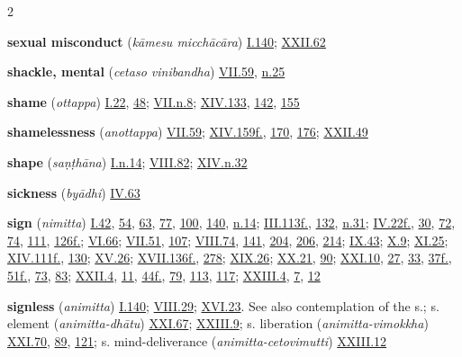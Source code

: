 \begin{multicols}{2}
\begin{vismHanging}
\par\textbf{sexual misconduct} (\emph{kāmesu micchācāra}) \hyperlink{I.140}{I.140}{}; \hyperlink{XXII.62}{XXII.62}{}
\par\textbf{shackle, mental} (\emph{cetaso vinibandha}) \hyperlink{VII.59}{VII.59}{}, \hyperlink{VII.n25}{n.25}{}
\par\textbf{shame} (\emph{ottappa}) \hyperlink{I.22}{I.22}{}, \hyperlink{I.48}{48}{}; \hyperlink{VII.n8}{VII.n.8}{}; \hyperlink{XIV.133}{XIV.133}{}, \hyperlink{XIV.142}{142}{}, \hyperlink{XIV.155}{155}{}
\par\textbf{shamelessness} (\emph{anottappa}) \hyperlink{VII.59}{VII.59}{}; \hyperlink{XIV.159}{XIV.159f.}{}, \hyperlink{XIV.170}{170}{}, \hyperlink{XIV.176}{176}{}; \hyperlink{XXII.49}{XXII.49}{}
\par\textbf{shape} (\emph{saṇṭhāna}) \hyperlink{I.n14}{I.n.14}{}; \hyperlink{VIII.82}{VIII.82}{}; \hyperlink{XIV.n32}{XIV.n.32}{}
\par\textbf{sickness} (\emph{byādhi}) \hyperlink{IV.63}{IV.63}{}
\par\textbf{sign} (\emph{nimitta}) \hyperlink{I.42}{I.42}{}, \hyperlink{I.54}{54}{}, \hyperlink{I.63}{63}{}, \hyperlink{I.77}{77}{}, \hyperlink{I.100}{100}{}, \hyperlink{I.140}{140}{}, \hyperlink{I.n14}{n.14}{}; \hyperlink{III.113}{III.113f.}{}, \hyperlink{III.132}{132}{}, \hyperlink{III.n31}{n.31}{}; \hyperlink{IV.22}{IV.22f.}{}, \hyperlink{IV.30}{30}{}, \hyperlink{IV.72}{72}{}, \hyperlink{IV.74}{74}{}, \hyperlink{IV.111}{111}{}, \hyperlink{IV.126}{126f.}{}; \hyperlink{VI.66}{VI.66}{}; \hyperlink{VII.51}{VII.51}{}, \hyperlink{VII.107}{107}{}; \hyperlink{VIII.74}{VIII.74}{}, \hyperlink{VIII.141}{141}{}, \hyperlink{VIII.204}{204}{}, \hyperlink{VIII.206}{206}{}, \hyperlink{VIII.214}{214}{}; \hyperlink{IX.43}{IX.43}{}; \hyperlink{X.9}{X.9}{}; \hyperlink{XI.25}{XI.25}{}; \hyperlink{XIV.111}{XIV.111f.}{}, \hyperlink{XIV.130}{130}{}; \hyperlink{XV.26}{XV.26}{}; \hyperlink{XVII.136}{XVII.136f.}{}, \hyperlink{XVII.278}{278}{}; \hyperlink{XIX.26}{XIX.26}{}; \hyperlink{XX.21}{XX.21}{}, \hyperlink{XX.90}{90}{}; \hyperlink{XXI.10}{XXI.10}{}, \hyperlink{XXI.27}{27}{}, \hyperlink{XXI.33}{33}{}, \hyperlink{XXI.37}{37f.}{}, \hyperlink{XXI.51}{51f.}{}, \hyperlink{XXI.73}{73}{}, \hyperlink{XXI.83}{83}{}; \hyperlink{XXII.4}{XXII.4}{}, \hyperlink{XXII.11}{11}{}, \hyperlink{XXII.44}{44f.}{}, \hyperlink{XXII.79}{79}{}, \hyperlink{XXII.113}{113}{}, \hyperlink{XXII.117}{117}{}; \hyperlink{XXIII.4}{XXIII.4}{}, \hyperlink{XXIII.7}{7}{}, \hyperlink{XXIII.12}{12}{}
\par\textbf{signless} (\emph{animitta}) \hyperlink{I.140}{I.140}{}; \hyperlink{VIII.29}{VIII.29}{}; \hyperlink{XVI.23}{XVI.23}{}. See also contemplation of the s.; s. element (\emph{animitta-dhātu}) \hyperlink{XXI.67}{XXI.67}{}; \hyperlink{XXIII.9}{XXIII.9}{}; s. liberation (\emph{animitta-vimokkha}) \hyperlink{XXI.70}{XXI.70}{}, \hyperlink{XXI.89}{89}{}, \hyperlink{XXI.121}{121}{}; s. mind-deliverance (\emph{animitta-cetovimutti}) \hyperlink{XXIII.12}{XXIII.12}{}

\end{vismHanging}
\end{multicols}
